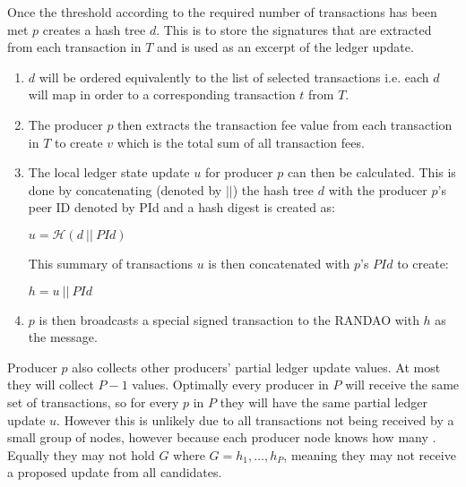 Once the threshold according to the required number of transactions has been met $p$ creates a hash tree $d$. This is to store the signatures that are extracted from each transaction in $T$ and is used as an excerpt of the ledger update. 

\begin{enumerate}


\item $d$ will be ordered equivalently to the list of selected transactions i.e. each $d$ will map in order to a corresponding transaction $t$ from $T$. 

\item The producer $p$ then extracts the transaction fee value from each transaction in $T$ to create $v$ which is the total sum of all transaction fees.

\item The local ledger state update $u$ for producer $p$ can then be calculated. This is done by concatenating (denoted by $||$) the hash tree $d$ with the producer $p$'s peer ID denoted by PId and a hash digest is created as:

\begin{center}
$u = \mathcal{H}(d~||~PId)$
\end{center}

This summary of transactions $u$ is then concatenated with $p$'s $PId$ to create:

\begin{center}
$h = u ~||~PId$
\end{center}

\item $p$ is then broadcasts a special signed transaction to the RANDAO with $h$ as the message.
\end{enumerate}


Producer $p$ also collects other producers' partial ledger update values. At most they will collect $P-1$ values. Optimally every producer in $P$ will receive the same set of transactions, so for every $p$ in $P$ they will have the same partial ledger update $u$. However this is unlikely due to all transactions not being received by a small group of nodes, however because each producer node knows how many . Equally they may not hold $G$ where $G = h_1,...,h_P$, meaning they may not receive a proposed update from all candidates.

